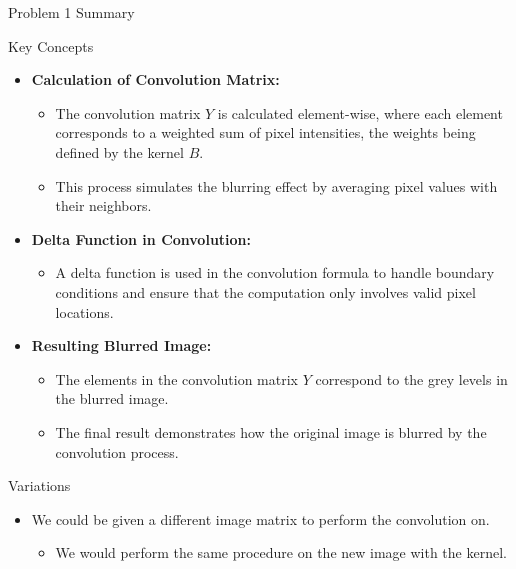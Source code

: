 \begin{summary}{Problem 1 Summary}
\begin{statement}{Key Concepts}
\begin{itemize}
\begin{itemize}
            \end{itemize}
            \item \textbf{Calculation of Convolution Matrix:}
            \begin{itemize}
                \item The convolution matrix $Y$ is calculated element-wise, where each element corresponds to a weighted sum of pixel intensities, the weights being defined by the kernel $B$.
                \item This process simulates the blurring effect by averaging pixel values with their neighbors.
            \end{itemize}
            \item \textbf{Delta Function in Convolution:}
            \begin{itemize}
                \item A delta function is used in the convolution formula to handle boundary conditions and ensure that the computation only involves valid pixel locations.
            \end{itemize}
            \item \textbf{Resulting Blurred Image:}
            \begin{itemize}
                \item The elements in the convolution matrix $Y$ correspond to the grey levels in the blurred image.
                \item The final result demonstrates how the original image is blurred by the convolution process.
            \end{itemize}
        \end{itemize}
    \end{statement}
    \begin{statement}{Variations}
        \begin{itemize}
            \item We could be given a different image matrix to perform the convolution on.
            \begin{itemize}
                \item We would perform the same procedure on the new image with the kernel.
            \end{itemize}
        \end{itemize}
    \end{statement}
\end{summary}


